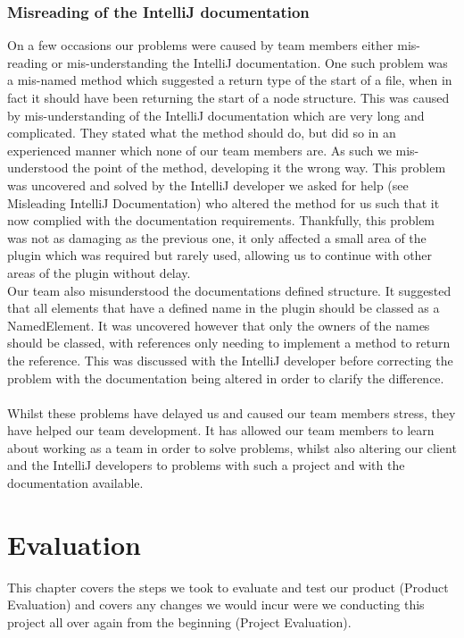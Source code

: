 \documentclass{l3proj}
\begin{document}
\subsection{ Misreading of the IntelliJ documentation}
On a few occasions our problems were caused by team members either mis-reading or mis-understanding the IntelliJ documentation. One such problem was a mis-named method which suggested a return type of the start of a file, when in fact it should have been returning the start of a node structure. This was caused by mis-understanding of the IntelliJ documentation which are very long and complicated. They stated what the method should do, but did so in an experienced manner which none of our team members are. As such we mis-understood the point of the method, developing it the wrong way. This problem was uncovered and solved by the IntelliJ developer we asked for help (see Misleading IntelliJ Documentation) who altered the method for us such that it now complied with the documentation requirements. Thankfully, this problem was not as damaging as the previous one, it only affected a small area of the plugin which was required but rarely used, allowing us to continue with other areas of the plugin without delay.\\
Our team also misunderstood the documentations defined structure. It suggested that all elements that have a defined name in the plugin should be classed as a NamedElement. It was uncovered however that only the owners of the names should be classed, with references only needing to implement a method to return the reference. This was discussed with the IntelliJ developer before correcting the problem with the documentation being altered in order to clarify the difference.\\
\\
Whilst these problems have delayed us and caused our team members stress, they have helped our team development. It has allowed our team members to learn about working as a team in order to solve problems, whilst also altering our client and the IntelliJ developers to problems with such a project and with the documentation available. 



\chapter{Evaluation}
This chapter covers the steps we took to evaluate and test our product (Product Evaluation) and covers any changes we would incur were we conducting this project all over again from the beginning (Project Evaluation).\\
\\
\end{document}
